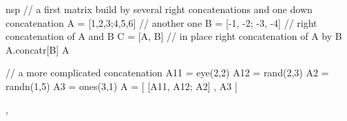 \begin{examples}

\begin{mintednsp}{nsp}
// a first matrix build by several right concatenations and one down concatenation 
A = [1,2,3;4,5,6]
// another one
B = [-1, -2; -3, -4]
// right concatenation of A and B
C = [A, B]
// in place right concatenation of A by B
A.concatr[B]
A

// a more complicated concatenation
A11 = eye(2,2)
A12 = rand(2,3)
A2 = randn(1,5)
A3 = ones(3,1)
A = [ [A11, A12; A2] , A3 ]
\end{mintednsp}


\end{examples}


\begin{manseealso}
, 
\end{manseealso}
